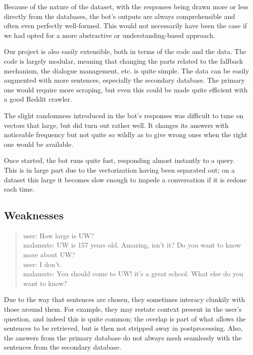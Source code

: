 \documentclass[11pt]{article}
\begin{document}
Because of the nature of the dataset, with the responses being drawn more or less directly from the databases, the bot's outputs are always comprehensible and often even perfectly well-formed. This would not necessarily have been the case if we had opted for a more abstractive or understanding-based approach.

Our project is also easily extensible, both in terms of the code and the data. The code is largely modular, meaning that changing the parts related to the fallback mechanism, the dialogue management, etc. is quite simple. The data can be easily augmented with more sentences, especially the secondary database. The primary one would require more scraping, but even this could be made quite efficient with a good Reddit crawler.

The slight randomness introduced in the bot's responses was difficult to tune on vectors that large, but did turn out rather well. It changes its answers with noticeable frequency but not quite so wildly as to give wrong ones when the right one would be available.

Once started, the bot runs quite fast, responding almost instantly to a query. This is in large part due to the vectorization having been separated out; on a dataset this large it becomes slow enough to impede a conversation if it is redone each time.

\subsection{Weaknesses}

\begin{quote}
	user: How large is UW? \\
	malamute: UW is 157 years old. Amazing, isn't it? Do you want to know more about UW? \\
	user: I don't. \\
	malamute: You should come to UW! it's a great school. What else do you want to know?
\end{quote}

Due to the way that sentences are chosen, they sometimes interacy clunkily with those around them. For example, they may restate context present in the user's question, and indeed this is quite common; the overlap is part of what allows the sentences to be retrieved, but is then not stripped away in postprocessing. Also, the answers from the primary database do not always mesh seamlessly with the sentences from the secondary database.
\end{document}
